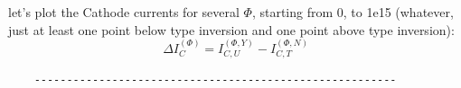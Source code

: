 \documentclass[preprint,12pt]{elsarticle}
\begin{document}
let's plot the Cathode currents for several $\Phi$, starting from 0, to 1e15 (whatever, just at least one point below type inversion and one point above type inversion):
\begin{equation}
    \Delta I_{C}^{(\Phi)}=I_{C,U}^{(\Phi,Y)}-I_{C,T}^{(\Phi,N)}
    \end{equation}

\begin{verbatim}
    --------------------------------------------------------
\end{verbatim}














\end{document}
